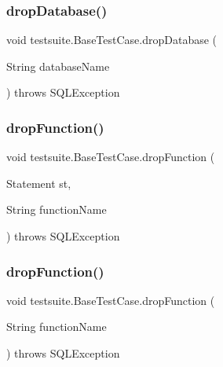 \subsubsection{\texorpdfstring{drop\+Database()}{dropDatabase()}\hspace{0.1cm}{\footnotesize\ttfamily [2/2]}}
{\footnotesize\ttfamily void testsuite.\+Base\+Test\+Case.\+drop\+Database (\begin{DoxyParamCaption}\item[{String}]{database\+Name }\end{DoxyParamCaption}) throws S\+Q\+L\+Exception\hspace{0.3cm}{\ttfamily [protected]}}

\mbox{\label{classtestsuite_1_1_base_test_case_ae40d8d8c945d750bd064ea265a1c48f3}} 
\subsubsection{\texorpdfstring{drop\+Function()}{dropFunction()}\hspace{0.1cm}{\footnotesize\ttfamily [1/2]}}
{\footnotesize\ttfamily void testsuite.\+Base\+Test\+Case.\+drop\+Function (\begin{DoxyParamCaption}\item[{Statement}]{st,  }\item[{String}]{function\+Name }\end{DoxyParamCaption}) throws S\+Q\+L\+Exception\hspace{0.3cm}{\ttfamily [protected]}}

\mbox{\label{classtestsuite_1_1_base_test_case_a361ab79861482404c0eb3c637fbf92e2}} 
\subsubsection{\texorpdfstring{drop\+Function()}{dropFunction()}\hspace{0.1cm}{\footnotesize\ttfamily [2/2]}}
{\footnotesize\ttfamily void testsuite.\+Base\+Test\+Case.\+drop\+Function (\begin{DoxyParamCaption}\item[{String}]{function\+Name }\end{DoxyParamCaption}) throws S\+Q\+L\+Exception\hspace{0.3cm}{\ttfamily [protected]}}


